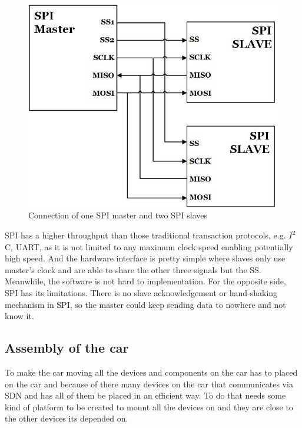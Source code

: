 \documentclass[11pt, titlepage]{article} %
\begin{document}
\begin{figure}[H]
	\centering
   	\includegraphics[scale=0.5]{spi-literature.jpg}
   	\caption{Connection of one SPI master and two SPI slaves}
    \label{fig:spi-literature}
\end{figure}

SPI has a higher throughput than those traditional transaction protocols, e.g. $I^{2}$C, UART, as it is not limited to any maximum clock speed enabling potentially high speed. And the hardware interface is pretty simple where slaves only use master's clock and are able to share the other three signals but the SS. Meanwhile, the software is not hard to implementation. For the opposite side, SPI has its limitations. There is no slave acknowledgement or hand-shaking mechanism in SPI, so the master could keep sending data to nowhere and not know it.


\subsection{Assembly of the car}
To make the car moving all the devices and components on the car has to placed on the car and because of there many devices on the car that communicates via SDN and has all of them be placed in an efficient way. To do that needs some kind of platform to be created to mount all the devices on and they are close to the other devices its depended on. 
\end{document}
